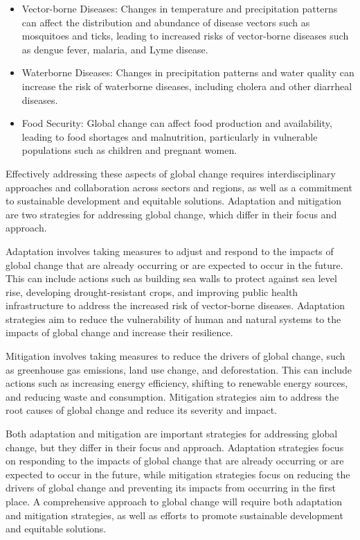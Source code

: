\begin{itemize}
\begin{itemize}
  \item Vector-borne Diseases: Changes in temperature and precipitation patterns can affect the distribution and abundance of disease vectors such as mosquitoes and ticks, leading to increased risks of vector-borne diseases such as dengue fever, malaria, and Lyme disease.
  \item Waterborne Diseases: Changes in precipitation patterns and water quality can increase the risk of waterborne diseases, including cholera and other diarrheal diseases.
  \item Food Security: Global change can affect food production and availability, leading to food shortages and malnutrition, particularly in vulnerable populations such as children and pregnant women.
  \end{itemize}
\end{itemize}

Effectively addressing these aspects of global change requires interdisciplinary approaches and collaboration across sectors and regions, as well as a commitment to sustainable development and equitable solutions. Adaptation and mitigation are two strategies for addressing global change, which differ in their focus and approach.

Adaptation involves taking measures to adjust and respond to the impacts of global change that are already occurring or are expected to occur in the future. This can include actions such as building sea walls to protect against sea level rise, developing drought-resistant crops, and improving public health infrastructure to address the increased risk of vector-borne diseases. Adaptation strategies aim to reduce the vulnerability of human and natural systems to the impacts of global change and increase their resilience.

Mitigation involves taking measures to reduce the drivers of global change, such as greenhouse gas emissions, land use change, and deforestation. This can include actions such as increasing energy efficiency, shifting to renewable energy sources, and reducing waste and consumption. Mitigation strategies aim to address the root causes of global change and reduce its severity and impact.

Both adaptation and mitigation are important strategies for addressing global change, but they differ in their focus and approach. Adaptation strategies focus on responding to the impacts of global change that are already occurring or are expected to occur in the future, while mitigation strategies focus on reducing the drivers of global change and preventing its impacts from occurring in the first place. A comprehensive approach to global change will require both adaptation and mitigation strategies, as well as efforts to promote sustainable development and equitable solutions.




